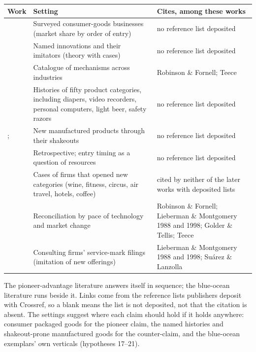 \begin{longtable}{>{\raggedright\arraybackslash}p{3.3cm}>{\raggedright\arraybackslash}p{5.2cm}>{\raggedright\arraybackslash}p{5.0cm}}
\toprule
Work & Setting & Cites, among these works \\
\midrule
\endhead
\citet{RobinsonFornell1985} & Surveyed consumer-goods businesses
(market share by order of entry) & no reference list deposited \\
\citet{Teece1986} & Named innovations and their imitators (theory with
cases) & no reference list deposited \\
\citet{LiebermanMontgomery1988} & Catalogue of mechanisms across
industries & Robinson \& Fornell; Teece \\
\citet{GolderTellis1993} & Histories of fifty product categories,
including diapers, video recorders, personal computers, light beer,
safety razors & no reference list deposited \\
\citet{KlepperMiller1995}; \citet{Klepper1997} & New manufactured
products through their shakeouts & no reference list deposited \\
\citet{LiebermanMontgomery1998} & Retrospective; entry timing as a
question of resources & no reference list deposited \\
\citet{KimMauborgne2004} & Cases of firms that opened new categories
(wine, fitness, circus, air travel, hotels, coffee) & cited by neither
of the later works with deposited lists \\
\citet{SuarezLanzolla2007} & Reconciliation by pace of technology and
market change & Robinson \& Fornell; Lieberman \& Montgomery 1988 and
1998; Golder \& Tellis; Teece \\
\citet{SemadeniAnderson2010} & Consulting firms' service-mark filings
(imitation of new offerings) & Lieberman \& Montgomery 1988 and 1998;
Su\'arez \& Lanzolla \\
\bottomrule
\end{longtable}

\noindent The pioneer-advantage literature answers itself in sequence;
the blue-ocean literature runs beside it. Links come from the reference
lists publishers deposit with Crossref, so a blank means the list is
not deposited, not that the citation is absent. The settings suggest
where each claim should hold if it holds anywhere: consumer packaged
goods for the pioneer claim, the named histories and shakeout-prone
manufactured goods for the counter-claim, and the blue-ocean exemplars'
own verticals (hypotheses 17--21).

